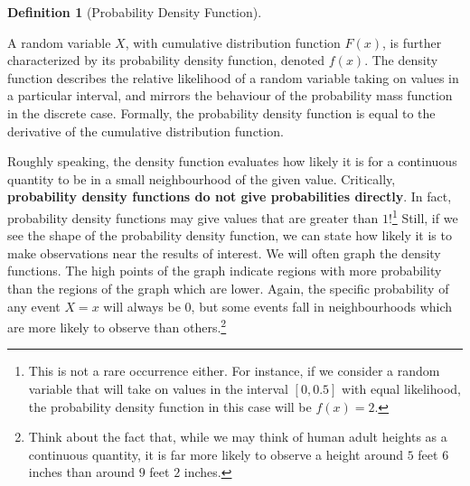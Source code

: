 \documentclass[
  letterpaper,
  DIV=11,
  numbers=noendperiod]{scrreprt}
\theoremstyle{definition}
\theoremstyle{definition}
\theoremstyle{definition}
\newtheorem{definition}{Definition}[chapter]
\theoremstyle{remark}
\begin{document}
\begin{definition}[Probability Density
Function]\protect\hypertarget{def-probability-density-function}{}\label{def-probability-density-function}

A random variable \(X\), with cumulative distribution function \(F(x)\),
is further characterized by its probability density function, denoted
\(f(x)\). The density function describes the relative likelihood of a
random variable taking on values in a particular interval, and mirrors
the behaviour of the probability mass function in the discrete case.
Formally, the probability density function is equal to the derivative of
the cumulative distribution function.

\end{definition}

Roughly speaking, the density function evaluates how likely it is for a
continuous quantity to be in a small neighbourhood of the given value.
Critically, \textbf{probability density functions do not give
probabilities directly}. In fact, probability density functions may give
values that are greater than \(1\)!\footnote{This is not a rare
  occurrence either. For instance, if we consider a random variable that
  will take on values in the interval \([0,0.5]\) with equal likelihood,
  the probability density function in this case will be \(f(x) = 2\).}
Still, if we see the shape of the probability density function, we can
state how likely it is to make observations near the results of
interest. We will often graph the density functions. The high points of
the graph indicate regions with more probability than the regions of the
graph which are lower. Again, the specific probability of any event
\(X=x\) will always be \(0\), but some events fall in neighbourhoods
which are more likely to observe than others.\footnote{Think about the
  fact that, while we may think of human adult heights as a continuous
  quantity, it is far more likely to observe a height around \(5\) feet
  \(6\) inches than around \(9\) feet \(2\) inches.}
\end{document}

